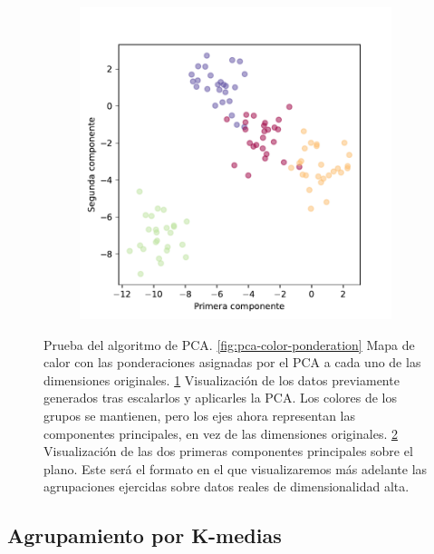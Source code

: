 \begin{figure}[]
\begin{subfigure}{0.45\textwidth}
    \caption{}
    \label{fig:pca-3d-labeled}
  \end{subfigure}
  \begin{subfigure}{0.45\textwidth}
    \centering
    \includegraphics[width=\textwidth]{figures/pca-labeled.pdf}
    \caption{}
    \label{fig:pca-labeled}
  \end{subfigure}
  \caption[Prueba del algoritmo de PCA.]{Prueba del algoritmo de PCA. \ref{fig:pca-color-ponderation} Mapa de calor con las ponderaciones asignadas por el PCA a cada uno de las dimensiones originales. \ref{fig:pca-3d-labeled} Visualización de los datos previamente generados tras escalarlos y aplicarles la PCA. Los colores de los grupos se mantienen, pero los ejes ahora representan las componentes principales, en vez de las dimensiones originales. \ref{fig:pca-labeled} Visualización de las dos primeras componentes principales sobre el plano. Este será el formato en el que visualizaremos más adelante las agrupaciones ejercidas sobre datos reales de dimensionalidad alta.}
  \label{fig:pca}
\end{figure}

\newpage
\subsection{Agrupamiento por K-medias}

